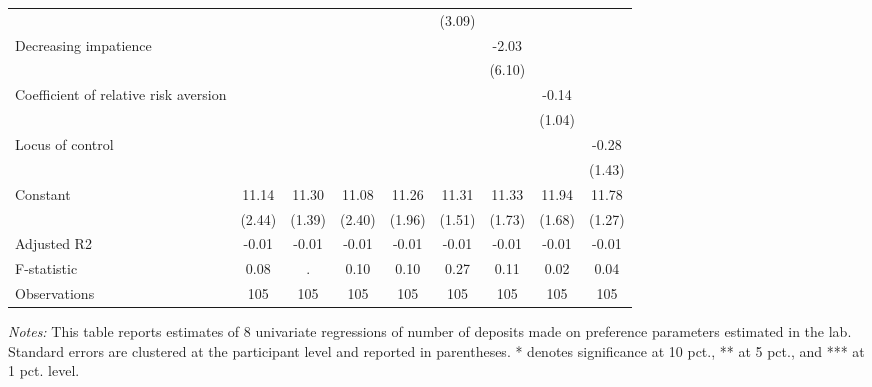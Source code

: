 \begin{table}[ht]
{\begin{threeparttable}
\begin{tabular}{l*{8}{c}}
                &                  &                  &                  &                  &   (3.09)         &                  &                  &                  \\
Decreasing impatience&                  &                  &                  &                  &                  &    -2.03         &                  &                  \\
                &                  &                  &                  &                  &                  &   (6.10)         &                  &                  \\
Coefficient of relative risk aversion&                  &                  &                  &                  &                  &                  &    -0.14         &                  \\
                &                  &                  &                  &                  &                  &                  &   (1.04)         &                  \\
Locus of control&                  &                  &                  &                  &                  &                  &                  &    -0.28         \\
                &                  &                  &                  &                  &                  &                  &                  &   (1.43)         \\
Constant        &    11.14\sym{***}&    11.30\sym{***}&    11.08\sym{***}&    11.26\sym{***}&    11.31\sym{***}&    11.33\sym{***}&    11.94\sym{***}&    11.78\sym{***}\\
                &   (2.44)         &   (1.39)         &   (2.40)         &   (1.96)         &   (1.51)         &   (1.73)         &   (1.68)         &   (1.27)         \\
\midrule
Adjusted R2     &    -0.01         &    -0.01         &    -0.01         &    -0.01         &    -0.01         &    -0.01         &    -0.01         &    -0.01         \\
F-statistic     &     0.08         &        .         &     0.10         &     0.10         &     0.27         &     0.11         &     0.02         &     0.04         \\
Observations    &      105         &      105         &      105         &      105         &      105         &      105         &      105         &      105         \\
\bottomrule \end{tabular} \begin{tablenotes}[flushleft] \footnotesize \item \emph{Notes:} This table reports estimates of 8 univariate regressions of number of deposits made on preference parameters estimated in the lab. Standard errors are clustered at the participant level and reported in parentheses. * denotes significance at 10 pct., ** at 5 pct., and *** at 1 pct. level. \end{tablenotes} \end{threeparttable} } \end{table}
